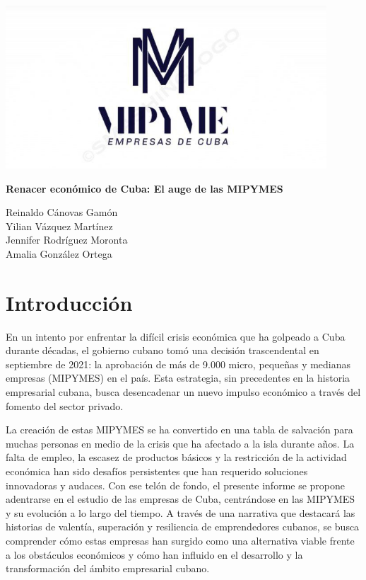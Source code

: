 \documentclass{article}
\begin{document}
	\begin{titlepage}
		\centering
		\vspace*{\fill}
		\includegraphics[width=0.9\textwidth]{logo.jpg}\par %
		\vspace{0.5cm} %
		{\Huge\bfseries Renacer económico de Cuba: El auge de las MIPYMES\par}
		\vspace{5cm}
		{\Large
			Reinaldo Cánovas Gamón\\
			Yilian Vázquez Martínez\\
			Jennifer Rodríguez Moronta\\
			Amalia González Ortega\par
		}
		\vspace*{\fill}
	\end{titlepage}
	
	\newpage

	
	\tableofcontents
	
	\newpage
	
	\section{Introducción}
	En un intento por enfrentar la difícil crisis económica que ha golpeado a Cuba durante décadas, el gobierno cubano tomó una decisión trascendental en septiembre de 2021: la aprobación de más de 9.000 micro, pequeñas y medianas empresas (MIPYMES) en el país. Esta estrategia, sin precedentes en la historia empresarial cubana, busca desencadenar un nuevo impulso económico a través del fomento del sector privado.
	
	La creación de estas MIPYMES se ha convertido en una tabla de salvación para muchas personas en medio de la crisis que ha afectado a la isla durante años. La falta de empleo, la escasez de productos básicos y la restricción de la actividad económica han sido desafíos persistentes que han requerido soluciones innovadoras y audaces.
	Con ese telón de fondo, el presente informe se propone adentrarse en el estudio de las empresas de Cuba, centrándose en las MIPYMES y su evolución a lo largo del tiempo. A través de una narrativa que destacará las historias de valentía, superación y resiliencia de emprendedores cubanos, se busca comprender cómo estas empresas han surgido como una alternativa viable frente a los obstáculos económicos y cómo han influido en el desarrollo y la transformación del ámbito empresarial cubano.
	
\end{document}

